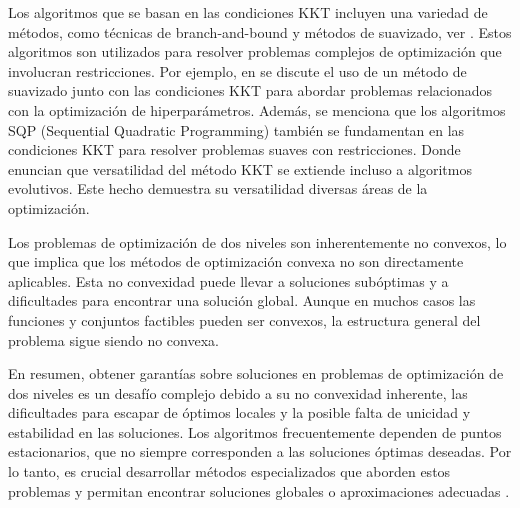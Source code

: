 Los algoritmos que se basan en las condiciones KKT incluyen una variedad de métodos, como técnicas de branch-and-bound y métodos de suavizado, ver \cite{DempeyZemkoho2020}. 
Estos algoritmos son utilizados para resolver problemas complejos de optimización que involucran restricciones. Por ejemplo, en \cite{DempeyZemkoho2020} se discute el uso de un método de suavizado junto con las condiciones KKT para abordar problemas relacionados con la optimización de hiperparámetros. Además, se menciona que los algoritmos SQP (Sequential Quadratic Programming) también se fundamentan en las condiciones KKT para resolver problemas suaves con restricciones. Donde enuncian que versatilidad del método KKT se extiende incluso a algoritmos evolutivos. Este hecho demuestra su versatilidad diversas áreas de la optimización.

Los problemas de optimización de dos niveles son inherentemente no convexos, lo que implica que los métodos de optimización convexa no son directamente aplicables. Esta no convexidad puede llevar a soluciones subóptimas y a dificultades para encontrar una solución global. Aunque en muchos casos las funciones y conjuntos factibles pueden ser convexos, la estructura general del problema sigue siendo no convexa.



En resumen, obtener garantías sobre soluciones en problemas de optimización de dos niveles es un desafío complejo debido a su no convexidad inherente, las dificultades para escapar de óptimos locales y la posible falta de unicidad y estabilidad en las soluciones. Los algoritmos frecuentemente dependen de puntos estacionarios, que no siempre corresponden a las soluciones óptimas deseadas. Por lo tanto, es crucial desarrollar métodos especializados que aborden estos problemas y permitan encontrar soluciones globales o aproximaciones adecuadas \cite{DempeyZemkoho2020}.


